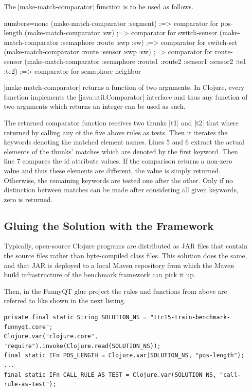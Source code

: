 \documentclass[submission]{eptcs}
\newcommand{\code}{\clojureinline}
\begin{document}
The \code|make-match-comparator| function is to be used as follows.

\begin{clojurecode*}{numbers=none}
(make-match-comparator :segment)
;=> comparator for pos-length
(make-match-comparator :sw)
;=> comparator for switch-sensor
(make-match-comparator :semaphore :route :swp :sw)
;=> comparator for switch-set
(make-match-comparator :route :sensor :swp :sw)
;=> comparator for route-sensor
(make-match-comparator :semaphore :route1 :route2 :sensor1 :sensor2 :te1 :te2)
;=> comparator for semaphore-neighbor
\end{clojurecode*}


\code|make-match-comparator| returns a function of two arguments.  In Clojure,
every function implements the \code|java.util.Comparator| interface and thus
any function of two arguments which returns an integer can be used as such.

The returned comparator function receives two thunks \code|t1| and \code|t2|
that where returned by calling any of the five above rules as tests.  Then it
iterates the keywords denoting the matched element names.  Lines 5 and 6
extract the actual elements of the thunks' matches which are denoted by the
first keyword.  Then line 7 compares the \textsf{id} attribute values.  If the
comparison returns a non-zero value and thus these elements are different, the
value is simply returned.  Otherwise, the remaining keywords are tested one
after the other.  Only if no distinction between matches can be made after
considering all given keywords, zero is returned.



\subsection{Gluing the Solution with the Framework}
\label{sec:gluing}

Typically, open-source Clojure programs are distributed as JAR files that
contain the source files rather than byte-compiled class files.  This solution
does the same, and that JAR is deployed to a local Maven repository from which
the Maven build infrastructure of the benchmark framework can pick it up.

Then, in the FunnyQT glue project the rules and functions from above are
referred to like shown in the next listing.

\begin{verbatim}
private final static String SOLUTION_NS = "ttc15-train-benchmark-funnyqt.core";
Clojure.var("clojure.core", "require").invoke(Clojure.read(SOLUTION_NS));
final static IFn POS_LENGTH = Clojure.var(SOLUTION_NS, "pos-length");
...
final static IFn CALL_RULE_AS_TEST = Clojure.var(SOLUTION_NS, "call-rule-as-test");
\end{verbatim}
\end{document}
